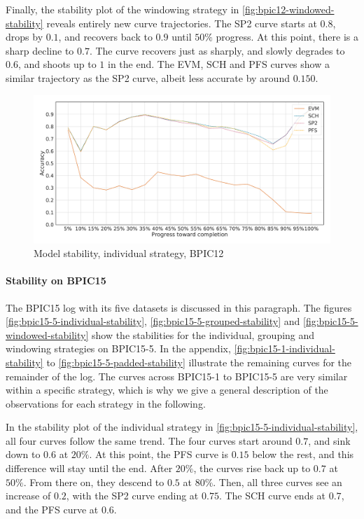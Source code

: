 Finally, the stability plot of the windowing strategy in \autoref{fig:bpic12-windowed-stability} reveals entirely new curve trajectories.
The SP2 curve starts at $0.8$, drops by $0.1$, and recovers back to $0.9$ until $50\%$ progress.
At this point, there is a sharp decline to $0.7$.
The curve recovers just as sharply, and slowly degrades to $0.6$, and shoots up to $1$ in the end.
The EVM, SCH and PFS curves show a similar trajectory as the SP2 curve, albeit less accurate by around $0.150$.

\begin{figure}[!htb]
    \centering
    \includegraphics[width=\textwidth]{gfx/bpic2012/individual_stability.pdf}
    \caption{Model stability, individual strategy, BPIC12}
    \label{fig:bpic12-individual-stability}
\end{figure}
\FloatBarrier

\paragraph{Stability on BPIC15}
The BPIC15 log with its five datasets is discussed in this paragraph.
The figures \autoref{fig:bpic15-5-individual-stability}, \autoref{fig:bpic15-5-grouped-stability} and \autoref{fig:bpic15-5-windowed-stability} show the stabilities for the individual, grouping and windowing strategies on BPIC15-5.
In the appendix, \autoref{fig:bpic15-1-individual-stability} to \autoref{fig:bpic15-5-padded-stability} illustrate the remaining curves for the remainder of the log.
The curves across BPIC15-1 to BPIC15-5 are very similar within a specific strategy, which is why we give a general description of the observations for each strategy in the following.

In the stability plot of the individual strategy in \autoref{fig:bpic15-5-individual-stability}, all four curves follow the same trend.
The four curves start around $0.7$, and sink down to $0.6$ at $20\%$.
At this point, the PFS curve is $0.15$ below the rest, and this difference will stay until the end.
After $20\%$, the curves rise back up to $0.7$ at $50\%$.
From there on, they descend to $0.5$ at $80\%$.
Then, all three curves see an increase of $0.2$, with the SP2 curve ending at $0.75$.
The SCH curve ends at $0.7$, and the PFS curve at $0.6$.


